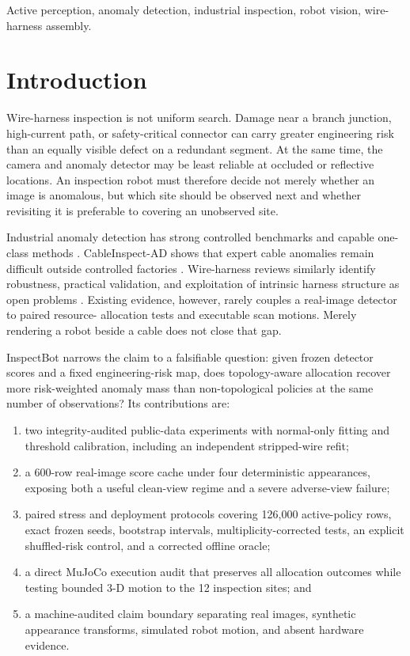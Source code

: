\documentclass[journal]{IEEEtran}
\begin{document}
\begin{IEEEkeywords}
Active perception, anomaly detection, industrial inspection, robot vision,
wire-harness assembly.
\end{IEEEkeywords}

\section{Introduction}

Wire-harness inspection is not uniform search.  Damage near a branch junction,
high-current path, or safety-critical connector can carry greater engineering
risk than an equally visible defect on a redundant segment.  At the same time,
the camera and anomaly detector may be least reliable at occluded or reflective
locations.  An inspection robot must therefore decide not merely whether an
image is anomalous, but which site should be observed next and whether revisiting
it is preferable to covering an unobserved site.

Industrial anomaly detection has strong controlled benchmarks and capable
one-class methods \cite{bergmann2019mvtec,defard2021padim,roth2022patchcore}.
CableInspect-AD shows that expert cable anomalies remain difficult outside
controlled factories \cite{arodi2024cableinspect}.  Wire-harness reviews
similarly identify robustness, practical validation, and exploitation of
intrinsic harness structure as open problems \cite{wang2024review}.  Existing
evidence, however, rarely couples a real-image detector to paired resource-
allocation tests and executable scan motions.  Merely rendering a robot beside
a cable does not close that gap.

InspectBot narrows the claim to a falsifiable question: given frozen detector
scores and a fixed engineering-risk map, does topology-aware allocation recover
more risk-weighted anomaly mass than non-topological policies at the same number
of observations?  Its contributions are:

\begin{enumerate}
  \item two integrity-audited public-data experiments with normal-only fitting
  and threshold calibration, including an independent stripped-wire refit;
  \item a 600-row real-image score cache under four deterministic appearances,
  exposing both a useful clean-view regime and a severe adverse-view failure;
  \item paired stress and deployment protocols covering 126,000 active-policy
  rows, exact frozen seeds, bootstrap intervals, multiplicity-corrected tests,
  an explicit shuffled-risk control, and a corrected offline oracle;
  \item a direct MuJoCo execution audit that preserves all allocation outcomes
  while testing bounded 3-D motion to the 12 inspection sites; and
  \item a machine-audited claim boundary separating real images, synthetic
  appearance transforms, simulated robot motion, and absent hardware evidence.
\end{enumerate}
\end{document}
